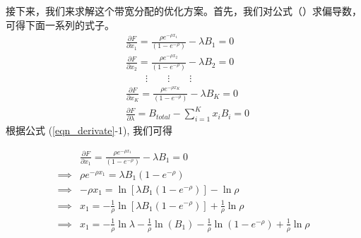 接下来，我们来求解这个带宽分配的优化方案。首先，我们对公式（）求偏导数，可得下面一系列的式子。
\begin{subequations}
\label{eqn_derivate}
\begin{align} &\frac{\partial F}{\partial x_1} =
\frac{\rho e^{-\rho x_1}}{(1-e^{-\rho})} - \lambda B_1 = 0 \tag{\theequation -1}\\
&\frac{\partial F}{\partial x_2} =
\frac{\rho e^{-\rho x_2}}{(1-e^{-\rho})} - \lambda B_2 = 0 \tag{\theequation -2}\\
\nonumber & \qquad \vdots \qquad \vdots \qquad \vdots \\
&\frac{\partial F}{\partial x_K} =
\frac{\rho e^{-\rho x_K}}{(1-e^{-\rho})} - \lambda B_K = 0 \tag{\theequation -K}\\
&\frac{\partial F}{\partial \lambda} = B_{total} -
\sum^K_{i=1}x_iB_i = 0 \tag{\theequation -K+1}
\end{align}
\end{subequations}
根据公式 (\ref{eqn_derivate}-1), 我们可得

\begin{equation*}
\begin{split}
&\frac{\partial F}{\partial x_1} = \frac{\rho e^{-\rho
x_1}}{(1-e^{-\rho})} - \lambda B_1 = 0\\
\implies &\rho e^{-\rho x_1} =\lambda B_1(1-e^{-\rho})\\
\implies &-\rho x_1 = \ln \left[\lambda B_1(1-e^{-\rho}) \right] -
\ln \rho \\
\implies &x_1 = -\frac{1}{\rho} \ln \left[
\lambda B_1(1-e^{-\rho})\right] + \frac{1}{\rho} \ln \rho \\
\implies &x_1 = -\frac{1}{\rho}\ln \lambda - \frac{1}{\rho} \ln
(B_1) - \frac{1}{\rho}\ln (1-e^{-\rho}) + \frac{1}{\rho} \ln
\rho
\end{split}
\end{equation*}

